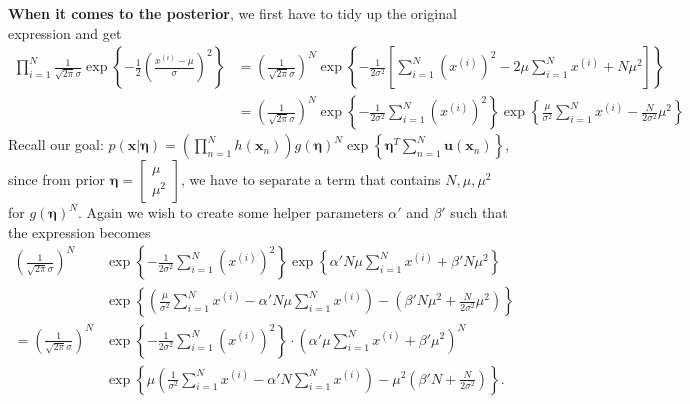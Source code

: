 \documentclass[12pt]{article}
\begin{document}
\textbf{When it comes to the posterior}, we first have to tidy up the original expression and get
\begin{align*}
    \prod_{i=1}^N\frac{1}{\sqrt{2\pi}\sigma}\exp\left\{ -\frac{1}{2}\left( \frac{x^{(i)}-\mu}{\sigma} \right)^2\right\}&=\left( \frac{1}{\sqrt{2\pi}\sigma} \right)^N\exp\left\{ -\frac{1}{2\sigma^2}\left[ \sum_{i=1}^N\left( x^{(i)} \right)^2-2\mu\sum_{i=1}^N x^{(i)}+N\mu^2 \right]\right\}\\
    &=\left( \frac{1}{\sqrt{2\pi}\sigma} \right)^N\exp\left\{ -\frac{1}{2\sigma^2}\sum_{i=1}^N\left( x^{(i)} \right)^2\right\}\exp\left\{ \frac{\mu}{\sigma^2}\sum_{i=1}^N x^{(i)}-\frac{N}{2\sigma^2}\mu^2\right\}
\end{align*}
Recall our goal: $p(\mathbf{x}|\bm{\eta})=\left(\prod_{n=1}^{N}h(\mathbf{x}_n)\right)g(\bm{\eta})^{N}\exp\left\{\bm{\eta}^T\sum_{n=1}^{N}\mathbf{u}(\mathbf{x}_n)\right\}$, since from prior $\bm{\eta}=\begin{bmatrix}
    \mu\\\mu^2
\end{bmatrix}$, we have to separate a term that contains $N,\mu,\mu^2$ for $g(\bm{\eta})^N$. Again we wish to create some helper parameters $\alpha'$ and $\beta'$ such that the expression becomes
\begin{align*}
    \left( \frac{1}{\sqrt{2\pi}\sigma} \right)^N&\exp\left\{ -\frac{1}{2\sigma^2}\sum_{i=1}^N\left( x^{(i)} \right)^2\right\}\exp\left\{ \alpha'N\mu\sum_{i=1}^N x^{(i)}+\beta'N\mu^2 \right\}\\
    &\exp\left\{ \left( \frac{\mu}{\sigma^2}\sum_{i=1}^N x^{(i)}-\alpha'N\mu\sum_{i=1}^N x^{(i)} \right)-\left( \beta'N\mu^2+\frac{N}{2\sigma^2}\mu^2 \right)\right\}\\
    =\left( \frac{1}{\sqrt{2\pi}\sigma} \right)^N&\exp\left\{ -\frac{1}{2\sigma^2}\sum_{i=1}^N\left( x^{(i)} \right)^2\right\}\cdot\left( \alpha'\mu\sum_{i=1}^N x^{(i)}+\beta'\mu^2 \right)^N\\
    &\exp\left\{ \mu\left( \frac{1}{\sigma^2}\sum_{i=1}^N x^{(i)}-\alpha'N\sum_{i=1}^N x^{(i)} \right)-\mu^2\left( \beta'N+\frac{N}{2\sigma^2} \right)\right\}.
\end{align*}
\end{document}
